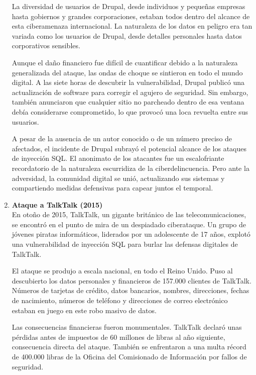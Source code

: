 \documentclass[11pt]{report}
\begin{document}
\begin{enumerate}
  La diversidad de usuarios de Drupal, desde individuos y pequeñas empresas hasta gobiernos y grandes corporaciones, estaban todos dentro del alcance
  de esta ciberamenaza internacional. La naturaleza de los datos en peligro era tan variada como los usuarios de Drupal, desde detalles personales hasta
  datos corporativos sensibles.

  Aunque el daño financiero fue difícil de cuantificar debido a la naturaleza generalizada del ataque, las ondas de choque se sintieron en todo el mundo
  digital. A las siete horas de descubrir la vulnerabilidad, Drupal publicó una actualización de software para corregir el agujero de seguridad. Sin embargo,
  también anunciaron que cualquier sitio no parcheado dentro de esa ventana debía considerarse comprometido, lo que provocó una loca revuelta entre sus usuarios.
    
  A pesar de la ausencia de un autor conocido o de un número preciso de afectados, el incidente de Drupal subrayó el potencial alcance de los ataques de inyección SQL.
  El anonimato de los atacantes fue un escalofriante recordatorio de la naturaleza escurridiza de la ciberdelincuencia. Pero ante la adversidad, la comunidad digital 
  se unió, actualizando sus sistemas y compartiendo medidas defensivas para capear juntos el temporal.

  \cleardoublepage

  \item \textbf{Ataque a TalkTalk (2015)} \\
  En otoño de 2015, TalkTalk, un gigante británico de las telecomunicaciones, se encontró en el punto de mira de un despiadado ciberataque. Un grupo de jóvenes piratas
  informáticos, liderados por un adolescente de 17 años, explotó una vulnerabilidad de inyección SQL para burlar las defensas digitales de TalkTalk.

  El ataque se produjo a escala nacional, en todo el Reino Unido. Puso al descubierto los datos personales y financieros de 157.000 clientes de TalkTalk. Números de 
  tarjetas de crédito, datos bancarios, nombres, direcciones, fechas de nacimiento, números de teléfono y direcciones de correo electrónico estaban en juego en este 
  robo masivo de datos.

  Las consecuencias financieras fueron monumentales. TalkTalk declaró unas pérdidas antes de impuestos de 60 millones de libras al año siguiente, consecuencia directa
  del ataque. También se enfrentaron a una multa récord de 400.000 libras de la Oficina del Comisionado de Información por fallos de seguridad.


\end{enumerate}
\end{document}
